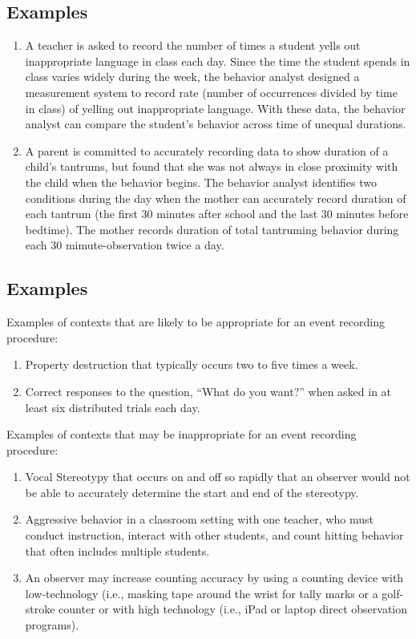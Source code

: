 \subsection{Examples}
\begin{enumerate}
\item A teacher is asked to record the number of times a student yells out inappropriate language in class each day. Since the time the student spends in class varies widely during the week, the behavior analyst designed a measurement system to record rate (number of occurrences divided by time in class) of yelling out inappropriate language. With these data, the behavior analyst can compare the student's behavior across time of unequal durations. 
\item A parent is committed to accurately recording data to show duration of a child's tantrums, but found that she was not always in close proximity with the child when the behavior begins. The behavior analyst identifies two conditions during the day when the mother can accurately record duration of each tantrum (the first 30 minutes after school and the last 30 minutes before bedtime). The mother records duration of total tantruming behavior during each 30 mimute-observation twice a day.
\end{enumerate}
%
\subsection{Examples}
Examples of contexts that are likely to be appropriate for an event recording procedure:
\begin{enumerate}
\item Property destruction that typically occurs two to five times a week. 
\item Correct responses to the question, ``What do you want?'' when asked in at least six distributed trials each day. 
\end{enumerate}
Examples of contexts that may be inappropriate for an event recording procedure: 
\begin{enumerate}
\item Vocal Stereotypy that occurs on and off so rapidly that an observer would not be able to accurately determine the start and end of the stereotypy.
\item Aggressive behavior in a classroom setting with one teacher, who must conduct instruction, interact with other students, and count hitting behavior that often includes multiple students.  
\item An observer may increase counting accuracy by using a counting device with low-technology (i.e., masking tape around the wrist for tally marks or a golf-stroke counter or with high technology (i.e., iPad or laptop direct observation programs). 
\end{enumerate}
%
